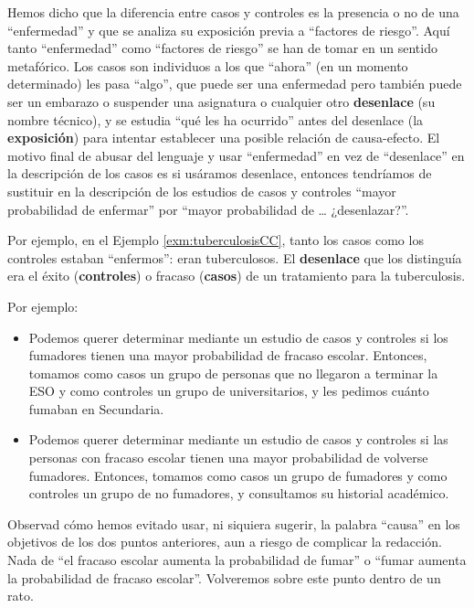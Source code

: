 \documentclass[
]{book}
\theoremstyle{definition}
\theoremstyle{definition}
\theoremstyle{definition}
\theoremstyle{definition}
\theoremstyle{remark}
\begin{document}
\begin{rmdcaution}
Hemos dicho que la diferencia entre casos y controles es la presencia o no de una ``enfermedad'' y que se analiza su exposición previa a ``factores de riesgo''. Aquí tanto ``enfermedad'' como ``factores de riesgo'' se han de tomar en un sentido metafórico. Los casos son individuos a los que ``ahora'' (en un momento determinado) les pasa ``algo'', que puede ser una enfermedad pero también puede ser un embarazo o suspender una asignatura o cualquier otro \textbf{desenlace} (su nombre técnico), y se estudia ``qué les ha ocurrido'' antes del desenlace (la \textbf{exposición}) para intentar establecer una posible relación de causa-efecto. El motivo final de abusar del lenguaje y usar ``enfermedad'' en vez de ``desenlace'' en la descripción de los casos es si usáramos desenlace, entonces tendríamos de sustituir en la descripción de los estudios de casos y controles ``mayor probabilidad de enfermar'' por ``mayor probabilidad de \ldots{} ¿desenlazar?''.

Por ejemplo, en el Ejemplo \ref{exm:tuberculosisCC}, tanto los casos como los controles estaban ``enfermos'': eran tuberculosos. El \textbf{desenlace} que los distinguía era el éxito (\textbf{controles}) o fracaso (\textbf{casos}) de un tratamiento para la tuberculosis.
\end{rmdcaution}

Por ejemplo:

\begin{itemize}
\item
  Podemos querer determinar mediante un estudio de casos y controles si los fumadores tienen una mayor probabilidad de fracaso escolar. Entonces, tomamos como casos un grupo de personas que no llegaron a terminar la ESO y como controles un grupo de universitarios, y les pedimos cuánto fumaban en Secundaria.
\item
  Podemos querer determinar mediante un estudio de casos y controles si las personas con fracaso escolar tienen una mayor probabilidad de volverse fumadores. Entonces, tomamos como casos un grupo de fumadores y como controles un grupo de no fumadores, y consultamos su historial académico.
\end{itemize}

\begin{rmdcaution}
Observad cómo hemos evitado usar, ni siquiera sugerir, la palabra ``causa'' en los objetivos de los dos puntos anteriores, aun a riesgo de complicar la redacción. Nada de ``el fracaso escolar aumenta la probabilidad de fumar'' o ``fumar aumenta la probabilidad de fracaso escolar''. Volveremos sobre este punto dentro de un rato.
\end{rmdcaution}
\end{document}
